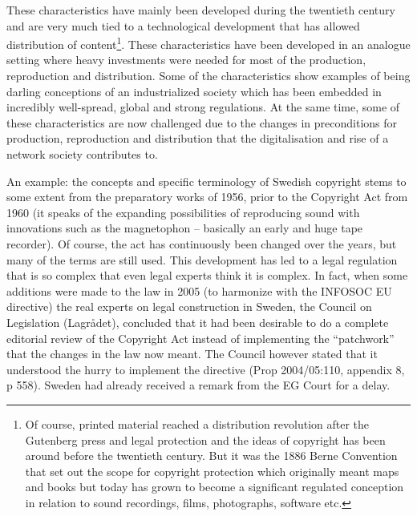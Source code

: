 These characteristics have mainly been developed during the twentieth century
and are very much tied to a technological development that has allowed
distribution of content\footnote{Of course, printed material reached a
distribution revolution after the Gutenberg press and legal protection and the
ideas of copyright has been around before the twentieth century. But it was the
1886 Berne Convention that set out the scope for copyright protection which
originally meant maps and books but today has grown to become a signif\hbox{}icant
regulated conception in relation to sound recordings, f\hbox{}ilms, photographs,
software etc.}. These characteristics have been developed in an analogue setting
where heavy investments were needed for most of the production, reproduction and
distribution. Some of the characteristics show examples of being darling
conceptions of an industrialized society which has been embedded in incredibly
well-spread, global and strong regulations. At the same time, some of these
characteristics are now challenged due to the changes in preconditions for
production, reproduction and distribution that the digitalisation and rise of a
network society contributes to. 

An example: the concepts and specif\hbox{}ic terminology of Swedish copyright stems to
some extent from the preparatory works of 1956, prior to the Copyright Act from
1960 (it speaks of the expanding possibilities of reproducing sound with
innovations such as the magnetophon – basically an early and huge tape
recorder). Of course, the act has continuously been changed over the years, but
many of the terms are still used. This development has led to a legal regulation
that is so complex that even legal experts think it is complex. In fact, when
some additions were made to the law in 2005 (to harmonize with the INFOSOC EU
directive) the real experts on legal construction in Sweden, the Council on
Legislation (Lagrådet), concluded that it had been desirable to do a complete
editorial review of the Copyright Act instead of implementing the ``patchwork''
that the changes in the law now meant. The Council however stated that it
understood the hurry to implement the directive (Prop 2004/05:110, appendix 8, p
558). Sweden had already received a remark from the EG Court for a
delay\cite{darling-larsson05}.

